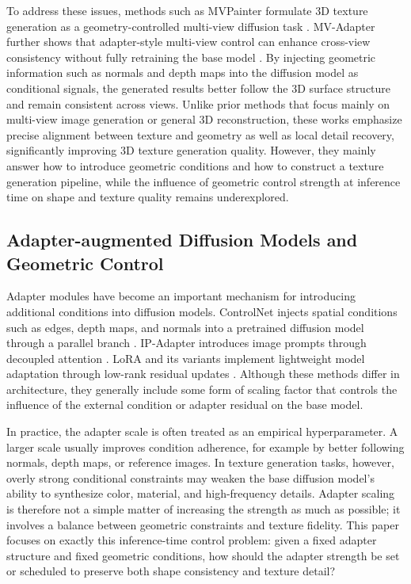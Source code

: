 \documentclass[times,twocolumn,final]{elsarticle}
\begin{document}
To address these issues, methods such as MVPainter formulate 3D texture generation as a geometry-controlled multi-view diffusion task \cite{shao2025mvpainter}. MV-Adapter further shows that adapter-style multi-view control can enhance cross-view consistency without fully retraining the base model \cite{huang2024mvadapter}. By injecting geometric information such as normals and depth maps into the diffusion model as conditional signals, the generated results better follow the 3D surface structure and remain consistent across views. Unlike prior methods that focus mainly on multi-view image generation or general 3D reconstruction, these works emphasize precise alignment between texture and geometry as well as local detail recovery, significantly improving 3D texture generation quality. However, they mainly answer how to introduce geometric conditions and how to construct a texture generation pipeline, while the influence of geometric control strength at inference time on shape and texture quality remains underexplored.

\subsection{Adapter-augmented Diffusion Models and Geometric Control}
\label{subsec:adapter}

Adapter modules have become an important mechanism for introducing additional conditions into diffusion models. ControlNet injects spatial conditions such as edges, depth maps, and normals into a pretrained diffusion model through a parallel branch \cite{zhang2023controlnet}. IP-Adapter introduces image prompts through decoupled attention \cite{ye2023ipadapter}. LoRA and its variants implement lightweight model adaptation through low-rank residual updates \cite{hu2022lora,liu2024dora,zhang2023adalora}. Although these methods differ in architecture, they generally include some form of scaling factor that controls the influence of the external condition or adapter residual on the base model.

In practice, the adapter scale is often treated as an empirical hyperparameter. A larger scale usually improves condition adherence, for example by better following normals, depth maps, or reference images. In texture generation tasks, however, overly strong conditional constraints may weaken the base diffusion model's ability to synthesize color, material, and high-frequency details. Adapter scaling is therefore not a simple matter of increasing the strength as much as possible; it involves a balance between geometric constraints and texture fidelity. This paper focuses on exactly this inference-time control problem: given a fixed adapter structure and fixed geometric conditions, how should the adapter strength be set or scheduled to preserve both shape consistency and texture detail?
\end{document}
